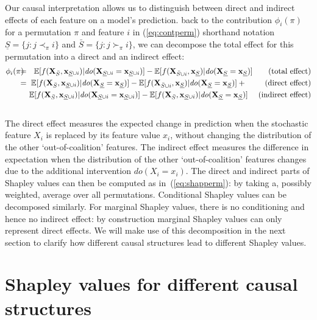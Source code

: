 \documentclass{article}
\newcommand{\vX}{\mathbf{X}}
\newcommand{\vx}{\mathbf{x}}
\newcommand{\expectation}{\mathbb{E}}
\newcommand{\contribution}{{\phi}}
\newcommand{\dodo}{\mathit{do}}
\newcommand{\ldo}[1]{\dodo(X_{#1} = x_{#1})}
\newcommand{\lvdo}[1]{\dodo(\vX_{#1} = \vx_{#1})}
\newcommand{\perm}{\pi}
\newcommand{\isequal}{\hspace*{-2.5mm} & = & \hspace*{-2.5mm}}
\newcommand{\Spre}{\underline{S}}
\newcommand{\Spost}{\bar{S}}
\begin{document}
Our causal interpretation allows us to distinguish between direct and indirect effects of each feature on a model's prediction.   back to the contribution $\contribution_i(\perm)$ for a permutation $\perm$ and feature $i$ in (\ref{eq:contperm}) shorthand notation $\Spre = \{j: j \prec_\perm i\}$ and $\Spost = \{j: j \succ_\perm i\}$, we can decompose the total effect for this permutation into a direct and an indirect effect:
\begin{eqnarray}
	\contribution_i(\perm) \isequal
	\expectation[f(\vX_{\Spost},\vx_{\Spre \cup i})|\lvdo{\Spre \cup i}] - \expectation[f(\vX_{\Spost \cup i},\vx_{\Spre})|\lvdo{\Spre}] ~~~~~~\mbox{(total effect)} \nonumber \\
	\isequal \expectation[f(\vX_{\Spost},\vx_{\Spre \cup i})|\lvdo{\Spre}] - \expectation[f(\vX_{\Spost \cup i},\vx_{\Spre})|\lvdo{\Spre}] + ~~~~~~~\mbox{(direct effect)} \nonumber \\
	&& \! \! \! \! \expectation[f(\vX_{\Spost},\vx_{\Spre \cup i})|\lvdo{\Spre \cup i}] - \expectation[f(\vX_{\Spost},\vx_{\Spre \cup i})|\lvdo{\Spre}] ~~~~\mbox{(indirect effect)} \nonumber \\ && ~~\label{eq:decomposition}
\end{eqnarray}
The direct effect measures the expected change in prediction when the stochastic feature $X_i$ is replaced by its feature value $x_i$, without changing the distribution of the other `out-of-coalition' features. The indirect effect measures the difference in expectation when the distribution of the other `out-of-coalition' features changes due to the additional intervention $\ldo{i}$. The direct and indirect parts of Shapley values can then be computed as in~(\ref{eq:shapperm}): by taking a, possibly weighted, average over all permutations. Conditional Shapley values can be decomposed similarly. For marginal Shapley values, there is no conditioning and hence no indirect effect: by construction marginal Shapley values can only represent direct effects. We will make use of this decomposition in the next section to clarify how different causal structures lead to different Shapley values.

\section{Shapley values for different causal structures}
\label{sec:toymodels}
\end{document}
